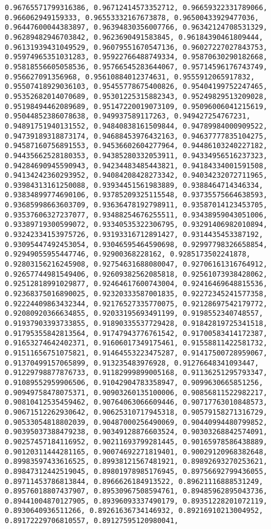 \documentclass[11pt]{article}
\begin{document}
\begin{Verbatim}[commandchars=\\\{\}]
0.96765571799316386, 0.96712414573352712, 0.96659322331789066, 0.966062949159333, 0.96553332167673878, 0.96500433929477036, 0.96447600044383897, 0.96394830356007766, 0.96342124708531329, 0.96289482946703842, 0.9623690491583845, 0.96184390461809444, 0.96131939431049529, 0.96079551670547136, 0.96027227027843753, 0.95974965351031283, 0.95922766488749334, 0.95870630290182668, 0.95818556605058536, 0.95766545283644067, 0.95714596176743749, 0.956627091356968, 0.95610884012374631, 0.9555912065917832, 0.95507418929036103, 0.95455778675400826, 0.95404199752247465, 0.95352682014070689, 0.95301225315882343, 0.95249829513209028, 0.95198494462089689, 0.95147220019073109, 0.95096006041215619, 0.95044852386078638, 0.949937589117263, 0.949427254767231, 0.94891751940131552, 0.94840838161509844, 0.94789984000909522, 0.94739189318873174, 0.94688453976432163, 0.94637777835104275, 0.94587160756891553, 0.94536602604277964, 0.94486103240227182, 0.94435662528180353, 0.94385280332053911, 0.94334956516237323, 0.94284690945590943, 0.94234483485443821, 0.94184334001591508, 0.94134242360293952, 0.94084208428273342, 0.94034232072711965, 0.93984313161250088, 0.93934451561983889, 0.9388464714346334, 0.93834899774690106, 0.93785209325115548, 0.93735575664638593, 0.93685998663603709, 0.93636478192798911, 0.93587014123453705, 0.93537606327237077, 0.93488254676255511, 0.93438959043051006, 0.93389719300599072, 0.93340535322306795, 0.93291406982010894, 0.93242334153975726, 0.93193316712891427, 0.9314435453387192, 0.93095447492453054, 0.93046595464590698, 0.92997798326658854, 0.92949055955447746, 0.92900368228162, 0.9285173502241878, 0.92803156216245908, 0.92754631688080047, 0.92706161316764912, 0.92657744981549406, 0.92609382562085818, 0.92561073938428062, 0.92512818991029877, 0.92464617600743004, 0.92416469648815536, 0.92368375016890025, 0.92320333587001835, 0.92272345241577358, 0.92224409863432344, 0.92176527335770075, 0.92128697542179772, 0.92080920366634855, 0.92033195693491199, 0.9198552340748557, 0.91937903393733855, 0.91890335537729428, 0.91842819725341518, 0.91795355842813564, 0.91747943776761542, 0.91700583414172387, 0.91653274642402371, 0.91606017349175461, 0.91558811422581732, 0.91511656751075821, 0.91464553223475287, 0.91417500728959067, 0.91370499157065899, 0.913235483976928, 0.91276648341093447, 0.91229798877876733, 0.91182999899005168, 0.91136251295793347, 0.91089552959906506, 0.91042904783358947, 0.9099630665851256, 0.90949758478075371, 0.90903260135100006, 0.90856811522982217, 0.90810412535459462, 0.90764063066609446, 0.90717763010848573, 0.90671512262930642, 0.90625310717945318, 0.90579158271316729, 0.90533054818802039, 0.90487000256490069, 0.90440994480799852, 0.90395037388479238, 0.90349128876603524, 0.90303268842574091, 0.90257457184116952, 0.90211693799281445, 0.90165978586438889, 0.90120311444281165, 0.90074692271819401, 0.90029120968382648, 0.89983597433616525, 0.89938121567481921, 0.89892693270253621, 0.89847312442519045, 0.89801978985176945, 0.89756692799436055, 0.89711453786813844, 0.8966626184913522, 0.89621116888531249, 0.89576018807437907, 0.89530967508594761, 0.89485962895043736, 0.89441004870127905, 0.89396093337490179, 0.89351228201072119, 0.8930640936511266, 0.89261636734146932, 0.89216910213004952, 0.89172229706810557, 0.89127595120980041, 
\end{Verbatim}
\end{document}
